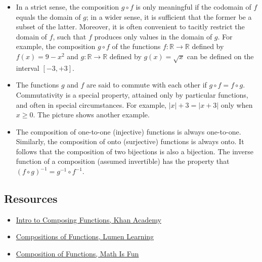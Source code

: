 \begin{itemize}
    \item In a strict sense, the composition $g \circ f$ is only meaningful if the codomain of $f$ equals the domain of $g$; in a wider sense, it is sufficient that the former be a subset of the latter. Moreover, it is often convenient to tacitly restrict the domain of $f$, such that $f$ produces only values in the domain of $g$. For example, the composition $g \circ f$ of the functions $f : \mathbb{R} \to \mathbb{R}$ defined by $f(x) = 9 - x^2$ and $g : \mathbb{R} \to \mathbb{R}$ defined by $g(x) = \sqrt{x}$ can be defined on the interval $[-3, +3]$.
\end{itemize}

\begin{itemize}
    \item The functions $g$ and $f$ are said to commute with each other if $g \circ f = f \circ g$. Commutativity is a special property, attained only by particular functions, and often in special circumstances. For example, $|x| + 3 = |x + 3|$ only when $x \geq 0$. The picture shows another example.
\end{itemize}


\begin{itemize}
    \item The composition of one-to-one (injective) functions is always one-to-one. Similarly, the composition of onto (surjective) functions is always onto. It follows that the composition of two bijections is also a bijection. The inverse function of a composition (assumed invertible) has the property that $(f \circ g)^{-1} = g^{-1} \circ f^{-1}$.
\end{itemize}

\subsection{Resources}
\label{sss:reso-55b5}

\begin{itemize}
    \item \href{https://www.khanacademy.org/math/precalculus/x9e81a4f98389efdf:composite/x9e81a4f98389efdf:composing/v/function-composition}{Intro to Composing Functions, Khan Academy}
    \item \href{https://courses.lumenlearning.com/wmopen-collegealgebra/chapter/introduction-compositions-of-functions/}{Compositions of Functions, Lumen Learning}
    \item \href{https://www.mathsisfun.com/sets/functions-composition.html}{Composition of Functions, Math Is Fun}
\end{itemize}

